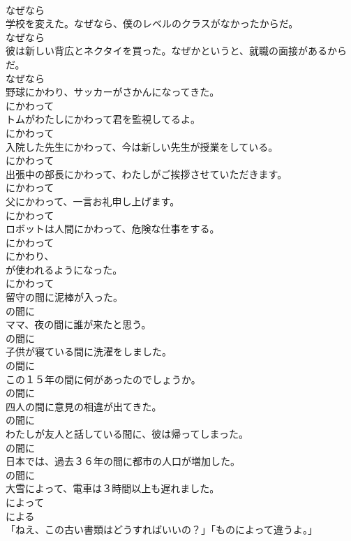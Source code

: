\documentclass[8pt]{extreport}
\begin{document}
\begin{CJK}{UTF8}{min}
\\	なぜなら	
\\	学校を変えた。なぜなら、僕のレベルのクラスがなかったからだ。	
\\	なぜなら	
\\	彼は新しい背広とネクタイを買った。なぜかというと、就職の面接があるからだ。	
\\	なぜなら	
\\	野球にかわり、サッカーがさかんになってきた。	
\\	にかわって	
\\	トムがわたしにかわって君を監視してるよ。	
\\	にかわって	
\\	入院した先生にかわって、今は新しい先生が授業をしている。	
\\	にかわって	
\\	出張中の部長にかわって、わたしがご挨拶させていただきます。	
\\	にかわって	
\\	父にかわって、一言お礼申し上げます。	
\\	にかわって	
\\	ロボットは人間にかわって、危険な仕事をする。	
\\	にかわって	
\\	にかわり、
\\	が使われるようになった。	
\\	にかわって	
\\	留守の間に泥棒が入った。	
\\	の間に	
\\	ママ、夜の間に誰が来たと思う。	
\\	の間に	
\\	子供が寝ている間に洗濯をしました。	
\\	の間に	
\\	この１５年の間に何があったのでしょうか。	
\\	の間に	
\\	四人の間に意見の相違が出てきた。	
\\	の間に	
\\	わたしが友人と話している間に、彼は帰ってしまった。	
\\	の間に	
\\	日本では、過去３６年の間に都市の人口が増加した。	
\\	の間に	
\\	大雪によって、電車は３時間以上も遅れました。	
\\	によって 
\\	による	
\\	「ねえ、この古い書類はどうすればいいの？」「ものによって違うよ。」	

\end{CJK}
\end{document}
